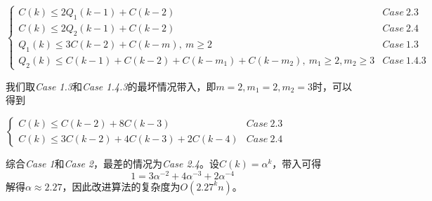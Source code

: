 \begin{center}
$\left\{
\begin{array}{lr}
	C(k) \le 2Q_1(k-1) + C(k-2) & Case~2.3 \\
	C(k) \le 2Q_2(k-1) + C(k-2) & Case~2.4 \\
	Q_1(k) \le 3C(k-2) + C(k-m),~m \ge 2 & Case~1.3 \\
	Q_2(k) \le C(k-1)+C(k-2) + C(k-m_1) + C(k-m_2),~m_1 \ge 2, m_2 \ge 3 & Case~1.4.3
\end{array}
\right.$
\end{center}

我们取\textit{Case 1.3}和\textit{Case 1.4.3}的最坏情况带入，即$m = 2, m_1 = 2, m_2 = 3$时，可以得到
\begin{center}
$\left\{
\begin{array}{lr}
	C(k) \le C(k-2) + 8C(k-3) & Case~2.3 \\
	C(k) \le 3C(k-2) + 4C(k-3) + 2C(k-4)& Case~2.4
\end{array}
\right.$
\end{center}

综合\textit{Case 1}和\textit{Case 2}，最差的情况为\textit{Case 2.4}。设$C(k) = \alpha ^ k$，带入可得
\begin{equation*}
 1 = 3\alpha ^ {-2} + 4\alpha ^ {-3} + 2\alpha ^{-4}
\end{equation*}
解得$\alpha \approx 2.27$，因此改进算法的复杂度为$O(2.27^kn)$。






















































